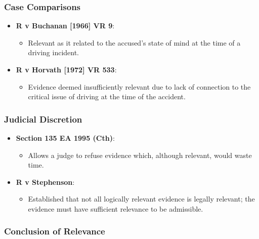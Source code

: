 \subsubsection{Case Comparisons}\label{case-comparisons}

\begin{itemize}
\tightlist
\item
  \textbf{R v Buchanan {[}1966{]} VR 9}:

  \begin{itemize}
  \tightlist
  \item
    Relevant as it related to the accused's state of mind at the time of
    a driving incident.
  \end{itemize}
\item
  \textbf{R v Horvath {[}1972{]} VR 533}:

  \begin{itemize}
  \tightlist
  \item
    Evidence deemed insufficiently relevant due to lack of connection to
    the critical issue of driving at the time of the accident.
  \end{itemize}
\end{itemize}

\subsubsection{Judicial Discretion}\label{judicial-discretion}

\begin{itemize}
\tightlist
\item
  \textbf{Section 135 EA 1995 (Cth)}:

  \begin{itemize}
  \tightlist
  \item
    Allows a judge to refuse evidence which, although relevant, would
    waste time.
  \end{itemize}
\item
  \textbf{R v Stephenson}:

  \begin{itemize}
  \tightlist
  \item
    Established that not all logically relevant evidence is legally
    relevant; the evidence must have sufficient relevance to be
    admissible.
  \end{itemize}
\end{itemize}

\subsubsection{Conclusion of Relevance}\label{conclusion-of-relevance}

